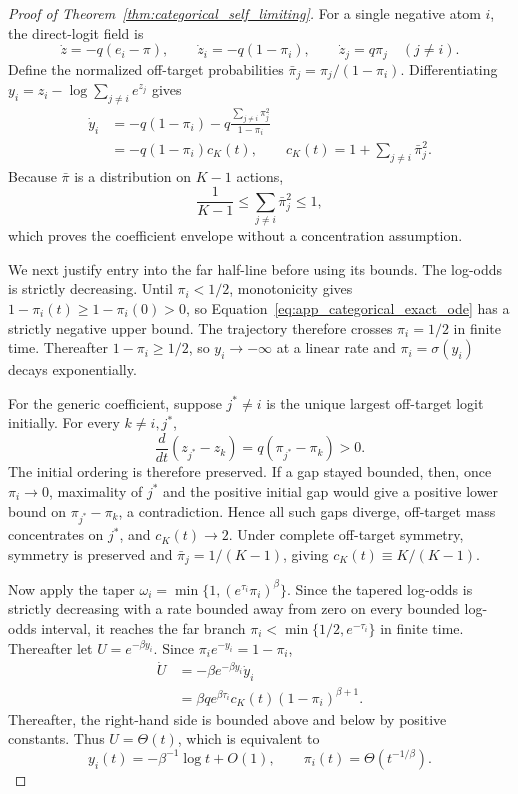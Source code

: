 \documentclass{article}
\theoremstyle{plain}
\theoremstyle{definition}
\theoremstyle{remark}
\begin{document}
\begin{proof}[Proof of Theorem~\ref{thm:categorical_self_limiting}]
For a single negative atom \(i\), the direct-logit field is
\[
\dot z=-q(e_i-\pi),
\qquad
\dot z_i=-q(1-\pi_i),
\qquad
\dot z_j=q\pi_j\quad(j\ne i).
\]
Define the normalized off-target probabilities
\(\bar\pi_j=\pi_j/(1-\pi_i)\). Differentiating
\(y_i=z_i-\log\sum_{j\ne i}e^{z_j}\) gives
\begin{align}
\dot y_i
&=-q(1-\pi_i)
-q\frac{\sum_{j\ne i}\pi_j^2}{1-\pi_i} \\
&=-q(1-\pi_i)c_K(t),
\qquad
c_K(t)=1+\sum_{j\ne i}\bar\pi_j^2.
\label{eq:app_categorical_exact_ode}
\end{align}
Because \(\bar\pi\) is a distribution on \(K-1\) actions,
\[
\frac1{K-1}\le\sum_{j\ne i}\bar\pi_j^2\le1,
\]
which proves the coefficient envelope without a concentration assumption.

We next justify entry into the far half-line before using its bounds.
The log-odds is strictly decreasing. Until \(\pi_i<1/2\), monotonicity
gives \(1-\pi_i(t)\ge1-\pi_i(0)>0\), so
Equation~\eqref{eq:app_categorical_exact_ode} has a strictly negative
upper bound. The trajectory therefore crosses \(\pi_i=1/2\) in finite
time. Thereafter \(1-\pi_i\ge1/2\), so \(y_i\to-\infty\) at a linear
rate and \(\pi_i=\sigma(y_i)\) decays exponentially.

For the generic coefficient, suppose \(j^*\ne i\) is the unique largest
off-target logit initially. For every \(k\ne i,j^*\),
\[
\frac{d}{dt}(z_{j^*}-z_k)=q(\pi_{j^*}-\pi_k)>0.
\]
The initial ordering is therefore preserved. If a gap stayed bounded,
then, once \(\pi_i\to0\), maximality of \(j^*\) and the positive initial
gap would give a positive lower bound on
\(\pi_{j^*}-\pi_k\), a contradiction. Hence all such gaps diverge,
off-target mass concentrates on \(j^*\), and \(c_K(t)\to2\). Under
complete off-target symmetry, symmetry is preserved and
\(\bar\pi_j=1/(K-1)\), giving
\(c_K(t)\equiv K/(K-1)\).

Now apply the taper
\(\omega_i=\min\{1,(e^{\tau_i}\pi_i)^\beta\}\). Since the tapered
log-odds is strictly decreasing with a rate bounded away from zero on every
bounded log-odds interval, it reaches the far branch
\(\pi_i<\min\{1/2,e^{-\tau_i}\}\) in finite time. Thereafter let
\(U=e^{-\beta y_i}\). Since
\(\pi_i e^{-y_i}=1-\pi_i\),
\begin{align}
\dot U
&=-\beta e^{-\beta y_i}\dot y_i \\
&=\beta q e^{\beta\tau_i}
c_K(t)(1-\pi_i)^{\beta+1}.
\label{eq:app_categorical_tapered_u}
\end{align}
Thereafter, the right-hand side is bounded above
and below by positive constants. Thus \(U=\Theta(t)\), which is
equivalent to
\[
y_i(t)=-\beta^{-1}\log t+O(1),
\qquad
\pi_i(t)=\Theta(t^{-1/\beta}).
\]
\end{proof}
\end{document}
